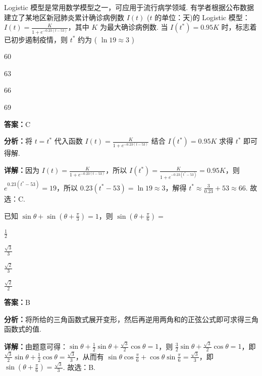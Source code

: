\begin{question}[points=5]
Logistic 模型是常用数学模型之一，可应用于流行病学领域. 有学者根据公布数据建立了某地区新冠肺炎累计确诊病例数 $I(t)$ ($t$ 的单位：天)的 Logistic 模型：$I(t)=\frac{K}{1+e^{-0.23(t-53)}}$，其中 $K$ 为最大确诊病例数. 当 $I(t^*)=0.95K$ 时，标志着已初步遏制疫情，则 $t^*$ 约为 ( $\ln19\approx3$ )
\begin{choices}
  \item $60$
  \item $63$
  \item $66$
  \item $69$
\end{choices}
\begin{solution}
\textbf{答案：}C

\textbf{分析：}将 $t=t^*$ 代入函数 $I(t)=\frac{K}{1+e^{-0.23(t-53)}}$ 结合 $I(t^*)=0.95K$ 求得 $t^*$ 即可得解.

\textbf{详解：}因为 $I(t)=\frac{K}{1+e^{-0.23(t-53)}}$，所以 $I(t^*)=\frac{K}{1+e^{-0.23(t^*-53)}}=0.95K$，则 $e^{0.23(t^*-53)}=19$，所以 $0.23(t^*-53)=\ln19\approx3$，解得 $t^*\approx\frac{3}{0.23}+53\approx66$. 故选：C.
\end{solution}
\end{question}

\begin{question}[points=5]
已知 $\sin\theta+\sin(\theta+\frac{\pi}{3})=1$，则 $\sin(\theta+\frac{\pi}{6})=$
\begin{choices}
  \item $\frac{1}{2}$
  \item $\frac{\sqrt{3}}{3}$
  \item $\frac{\sqrt{2}}{3}$
  \item $\frac{\sqrt{2}}{2}$
\end{choices}
\begin{solution}
\textbf{答案：}B

\textbf{分析：}将所给的三角函数式展开变形，然后再逆用两角和的正弦公式即可求得三角函数式的值.

\textbf{详解：}由题意可得：$\sin\theta+\frac{1}{2}\sin\theta+\frac{\sqrt{3}}{2}\cos\theta=1$，则 $\frac{3}{2}\sin\theta+\frac{\sqrt{3}}{2}\cos\theta=1$，即 $\frac{\sqrt{3}}{2}\sin\theta+\frac{1}{2}\cos\theta=\frac{\sqrt{3}}{3}$，从而有 $\sin\theta\cos\frac{\pi}{6}+\cos\theta\sin\frac{\pi}{6}=\frac{\sqrt{3}}{3}$，即 $\sin(\theta+\frac{\pi}{6})=\frac{\sqrt{3}}{3}$. 故选：B.
\end{solution}
\end{question}

